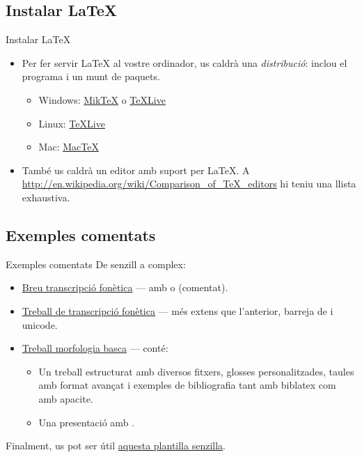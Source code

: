\subsection{Instalar \LaTeX{}}
\begin{frame}{Instalar \LaTeX}
\begin{itemize}
\item Per fer servir \LaTeX{} al vostre ordinador, us caldrà una \emph{distribució}: 
    inclou el programa  i un munt de paquets. 
\begin{itemize}
\item Windows: \href{http://miktex.org/}{Mik\TeX} o \href{http://tug.org/texlive/}{\TeX Live}
\item Linux: \href{http://tug.org/texlive/}{\TeX Live}
\item Mac: \href{http://tug.org/mactex/}{Mac\TeX}
\end{itemize}
\item També us caldrà un editor amb suport per \LaTeX{}. A \url{http://en.wikipedia.org/wiki/Comparison_of_TeX_editors} hi teniu una llista exhaustiva.
\end{itemize}
\end{frame}

\subsection{Exemples comentats}
\begin{frame}{Exemples comentats}
De senzill a complex:
\begin{itemize}
    \item \href{https://www.overleaf.com/read/rgxbsfvqsgbw\#ba04b9}{Breu transcripció fonètica} --- amb  o  (comentat). 
    \item \href{https://www.overleaf.com/read/mxysfjcnnppm\#294a25}{Treball de transcripció fonètica} --- més extens que l'anterior, barreja de  i unicode.
    \item \href{https://www.overleaf.com/read/sxkcdfrpmbcb\#10abd3}{Treball morfologia basca} --- conté:
\begin{itemize}
    \item Un treball estructurat amb diversos fitxers, glosses personalitzades, taules amb format avançat i exemples de bibliografia tant amb biblatex com amb apacite.
    \item Una presentació amb .
\end{itemize}
\end{itemize}

Finalment, us pot ser útil \href{https://www.overleaf.com/read/vsdvmbzywdrn\#d43fce}{aquesta plantilla senzilla}.

\end{frame}

